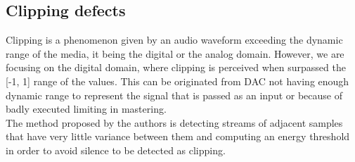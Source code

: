 \subsection{Clipping defects}
Clipping is a phenomenon given by an audio waveform exceeding the dynamic range of the media, it being the digital or the analog 
domain. However, we are focusing on the digital domain, where clipping is perceived when surpassed the [-1, 1] range of the values. 
This can be originated from DAC not having enough dynamic range to represent the signal that is passed as an input or because of badly 
executed limiting in mastering. \\
The method proposed by the authors is detecting streams of adjacent samples that have very little variance between them and computing 
an energy threshold in order to avoid silence to be detected as clipping.\\


\newpage


